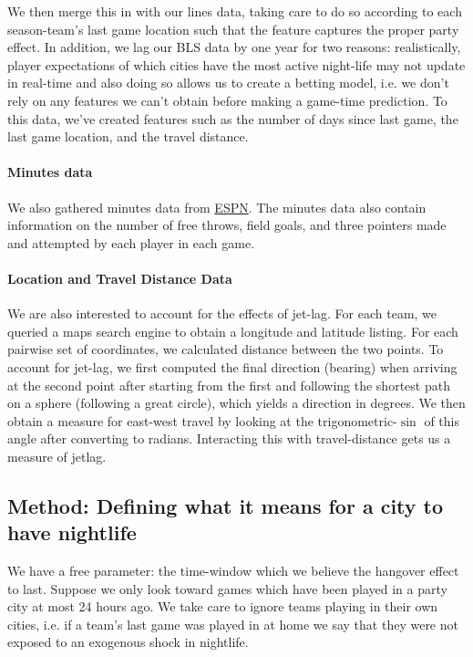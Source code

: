 \documentclass[letterpaper,12pt]{article}
\begin{document}
We then merge this in with our lines data, taking care to do so according to each season-team's last game location such that the feature captures the proper
party effect. In addition, we lag our BLS data by one year for two reasons:
realistically, player expectations of which cities have the most active night-life may not
update in real-time and also doing so allows us to create a betting model, i.e.
we don't rely on any features we can't obtain before making a game-time prediction. 
To this data, we've created features such as 
the number of days since last game, the last game location, and the travel distance. 

\paragraph{Minutes data}
We also gathered minutes data from \href{http://www.espn.com/nba/scoreboard/_/date/}{ESPN}.
The minutes data also contain information on the number of free throws, field goals, and three pointers made and attempted by each player in each game.

\paragraph{Location and Travel Distance Data} We are also interested
to account for the effects of jet-lag. For each team, we queried
a maps search engine to obtain a longitude and latitude listing.\cite{ggmap}
For each pairwise set of coordinates, we calculated distance between the two
points.\cite{sp} To account for jet-lag, we first computed the final direction 
(bearing) when arriving at the 
second point after starting from the first and following the shortest path on a sphere 
(following a great circle), which yields a direction in degrees. 
We then obtain a measure for east-west travel by looking at the trigonometric-$\sin$ of this angle after converting to radians.
Interacting this with travel-distance gets us a measure of jetlag.\cite{lallensack}

\subsection{Method: Defining what it means for a city to have nightlife}
We have a free parameter: the time-window which we believe the hangover effect
to last. Suppose we only look toward games which have been played in a party
city at most 24 hours ago. We take care to ignore
teams playing in their own cities, i.e. if a team's last game was played in at home 
we say that they were not exposed to an exogenous shock in nightlife.
\end{document}
